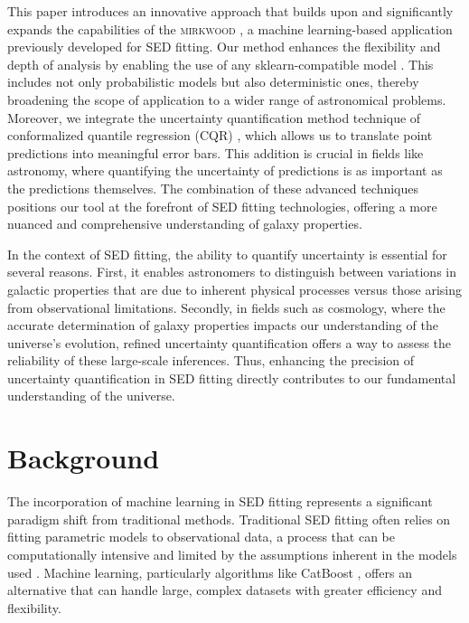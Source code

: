 \documentclass[letterpaper]{article}
\begin{document}
This paper introduces an innovative approach that builds upon and significantly expands the capabilities of the \textsc{mirkwood} \cite{Gilda21}, a machine learning-based application previously developed for SED fitting. Our method enhances the flexibility and depth of analysis by enabling the use of any sklearn-compatible model \cite{scikit-learn}. This includes not only probabilistic models but also deterministic ones, thereby broadening the scope of application to a wider range of astronomical problems. Moreover, we integrate the uncertainty quantification method technique of conformalized quantile regression (CQR) \cite{cqr}, which allows us to translate point predictions into meaningful error bars. This addition is crucial in fields like astronomy, where quantifying the uncertainty of predictions is as important as the predictions themselves. The combination of these advanced techniques positions our tool at the forefront of SED fitting technologies, offering a more nuanced and comprehensive understanding of galaxy properties.

In the context of SED fitting, the ability to quantify uncertainty is essential for several reasons. First, it enables astronomers to distinguish between variations in galactic properties that are due to inherent physical processes versus those arising from observational limitations. Secondly, in fields such as cosmology, where the accurate determination of galaxy properties impacts our understanding of the universe's evolution, refined uncertainty quantification offers a way to assess the reliability of these large-scale inferences. Thus, enhancing the precision of uncertainty quantification in SED fitting directly contributes to our fundamental understanding of the universe.



\section{Background}
The incorporation of machine learning in SED fitting represents a significant paradigm shift from traditional methods. Traditional SED fitting often relies on fitting parametric models to observational data, a process that can be computationally intensive and limited by the assumptions inherent in the models used \cite{walcher2011fitting, conroy2013modeling}. Machine learning, particularly algorithms like CatBoost \cite{dorogush2018catboost}, offers an alternative that can handle large, complex datasets with greater efficiency and flexibility.
\end{document}
